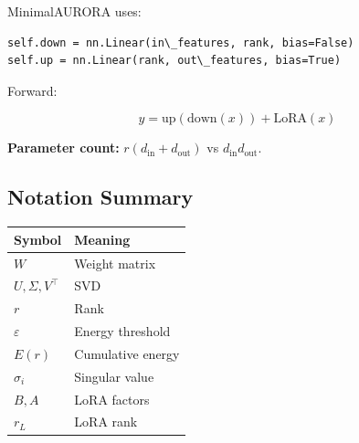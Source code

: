 MinimalAURORA uses:

\begin{lstlisting}
self.down = nn.Linear(in\_features, rank, bias=False)
self.up = nn.Linear(rank, out\_features, bias=True)
\end{lstlisting}

Forward:

\[
y = \text{up}(\text{down}(x)) + \text{LoRA}(x)
\tag{3.6}
\]

\textbf{Parameter count:} $r(d_\text{in} + d_\text{out})$ vs $d_\text{in} d_\text{out}$.

\subsection{Notation Summary}

\begin{table}[H]
\centering
\small
\begin{tabular}{ll}
\toprule
\textbf{Symbol} & \textbf{Meaning} \\
\midrule
$W$ & Weight matrix \\
$U, \Sigma, V^\top$ & SVD \\
$r$ & Rank \\
$\varepsilon$ & Energy threshold \\
$E(r)$ & Cumulative energy \\
$\sigma_i$ & Singular value \\
$B, A$ & LoRA factors \\
$r_L$ & LoRA rank \\
\bottomrule
\end{tabular}
\end{table}

